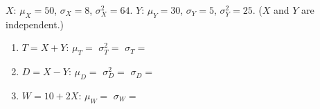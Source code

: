 \documentclass[10pt]{article}
\begin{document}
\vspace{0.1in}

\begin{practicebox}
\small
$X$: $\mu_X = 50$, $\sigma_X = 8$, $\sigma^2_X = 64$.
$Y$: $\mu_Y = 30$, $\sigma_Y = 5$, $\sigma^2_Y = 25$. ($X$ and $Y$ are independent.)

\begin{enumerate}[leftmargin=1.5em, itemsep=8pt]
  \item $T = X + Y$: \quad $\mu_T = $ \blank{2cm} \quad $\sigma^2_T = $ \blank{2cm} \quad
        $\sigma_T = $ \blank{3cm}

  \item $D = X - Y$: \quad $\mu_D = $ \blank{2cm} \quad $\sigma^2_D = $ \blank{2cm} \quad
        $\sigma_D = $ \blank{3cm}

  \item $W = 10 + 2X$: \quad $\mu_W = $ \blank{3cm} \quad $\sigma_W = $ \blank{3cm}
\end{enumerate}
\end{practicebox}
\end{document}
